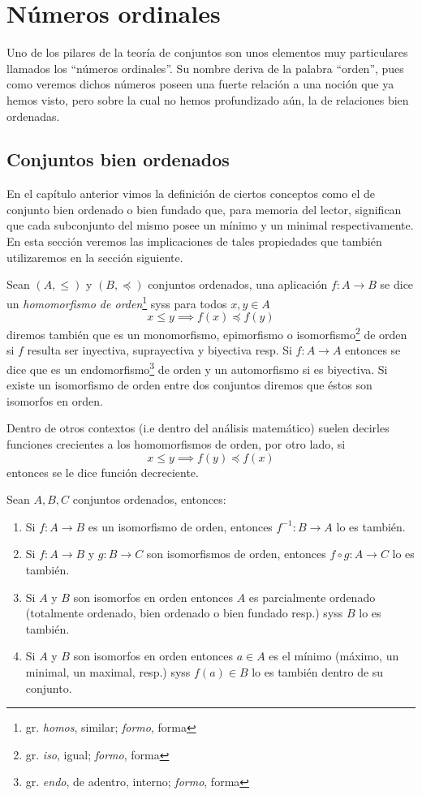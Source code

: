 \documentclass[11pt,a4paper]{book}
\begin{document}
\chapter{Números ordinales}
Uno de los pilares de la teoría de conjuntos son unos elementos muy particulares llamados los ``números ordinales''. Su nombre deriva de la palabra ``orden'', pues como veremos dichos números poseen una fuerte relación a una noción que ya hemos visto, pero sobre la cual no hemos profundizado aún, la de relaciones bien ordenadas.

\section{Conjuntos bien ordenados}
En el capítulo anterior vimos la definición de ciertos conceptos como el de conjunto bien ordenado o bien fundado que, para memoria del lector, significan que cada subconjunto del mismo posee un mínimo y un minimal respectivamente. En esta sección veremos las implicaciones de tales propiedades que también utilizaremos en la sección siguiente.
\begin{mydef}
	Sean $(A,\leq)$ y $(B,\preceq)$ conjuntos ordenados, una aplicación $f:A\rightarrow B$ se dice un \textit{homomorfismo de orden}\footnote{gr. \textit{homos}, similar; \textit{formo}, forma} syss para todos $x,y\in A$
	$$x\leq y\implies f(x)\preceq f(y)$$
	diremos también que es un monomorfismo, epimorfismo o isomorfismo\footnote{gr. \textit{iso}, igual; \textit{formo}, forma} de orden si $f$ resulta ser inyectiva, suprayectiva y biyectiva resp. Si $f:A\rightarrow A$ entonces se dice que es un endomorfismo\footnote{gr. \textit{endo}, de adentro, interno; \textit{formo}, forma} de orden y un automorfismo si es biyectiva. Si existe un isomorfismo de orden entre dos conjuntos diremos que éstos son isomorfos en orden.

	Dentro de otros contextos (i.e dentro del análisis matemático) suelen decirles funciones crecientes a los homomorfismos de orden, por otro lado, si 
	$$x\leq y\implies f(y)\preceq f(x)$$
	entonces se le dice función decreciente.
\end{mydef}
\begin{prop}
	Sean $A,B,C$ conjuntos ordenados, entonces:
	\begin{enumerate}
		\item Si $f:A\rightarrow B$ es un isomorfismo de orden, entonces $f^{-1}:B\rightarrow A$ lo es también.
		\item Si $f:A\rightarrow B$ y $g:B\rightarrow C$ son isomorfismos de orden, entonces $f\circ g:A\rightarrow C$ lo es también.
		\item Si $A$ y $B$ son isomorfos en orden entonces $A$ es parcialmente ordenado (totalmente ordenado, bien ordenado o bien fundado resp.) syss $B$ lo es también.
		\item Si $A$ y $B$ son isomorfos en orden entonces $a\in A$ es el mínimo (máximo, un minimal, un maximal, resp.) syss $f(a)\in B$ lo es también dentro de su conjunto.
	\end{enumerate}
\end{prop}
\end{document}
